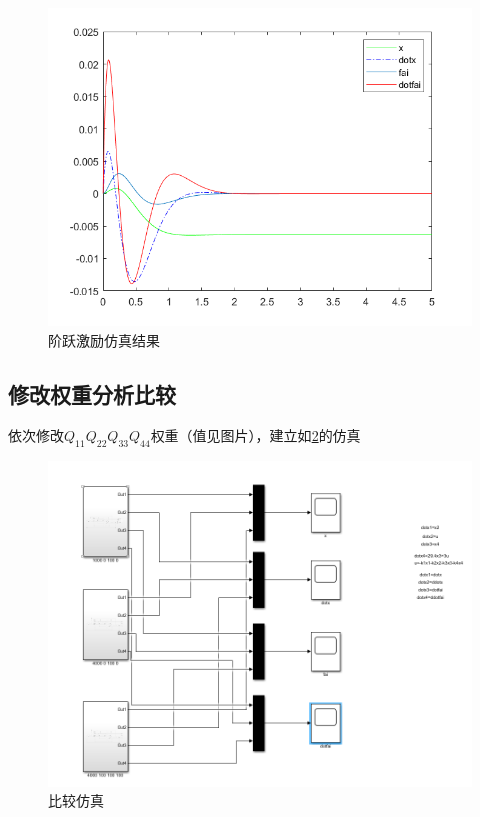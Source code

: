 \begin{figure}[hbpt]
\centering
\includegraphics[width=12cm]{1000_100_2.png}
\caption{阶跃激励仿真结果}\label{1000_100_2}
\end{figure}

\subsection{修改权重分析比较}

依次修改$Q_{11}Q_{22}Q_{33}Q_{44}$权重（值见图片），建立如\ref{compare}的仿真

\begin{figure}[hbpt]
\centering
\includegraphics[width=12cm]{compare.png}
\caption{比较仿真}\label{compare}
\end{figure}


